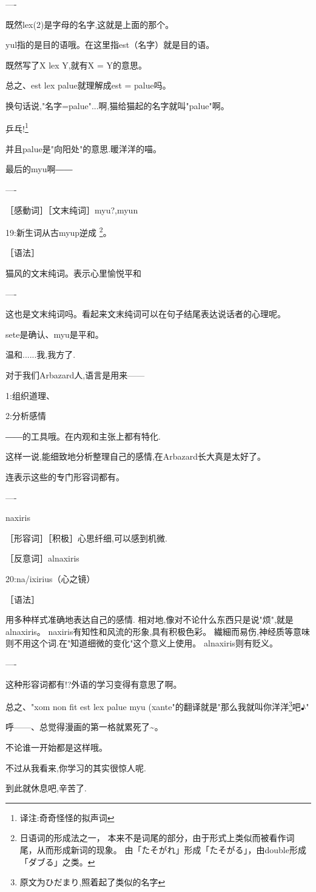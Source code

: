 ----


既然lex(2)是字母的名字,这就是上面的那个。

yul指的是目的语哦。在这里指est（名字）就是目的语。

既然写了X lex Y,就有X = Y的意思。


总之、est lex palue就理解成est = palue吗。

换句话说,"名字=palue"...啊,猫给猫起的名字就叫"palue"啊。



乒乓!\footnote{译注:奇奇怪怪的拟声词}

并且palue是"向阳处"的意思.暖洋洋的喵。

最后的myu啊――

----

［感動词］［文末纯词］myu?,myun

19:新生词从古myup逆成
\footnote{日语词的形成法之一，
本来不是词尾的部分，由于形式上类似而被看作词尾，从而形成新词的现象。
由「たそがれ」形成「たそがる」，由double形成「ダブる」之类。}。

［语法］

猫风的文末纯词。表示心里愉悦平和


----


这也是文末纯词吗。看起来文末纯词可以在句子结尾表达说话者的心理呢。

sete是确认、myu是平和。

温和......我,我方了.



对于我们Arbazard人,语言是用来------

1:组织道理、

2:分析感情

――的工具哦。在内观和主张上都有特化.



这样一说,能细致地分析整理自己的感情,在Arbazard长大真是太好了。

连表示这些的专门形容词都有。

----

naxiris

［形容词］［积极］心思纤细,可以感到机微.

［反意词］alnaxiris

20:na/ixirius（心之镜）

［语法］

用多种样式准确地表达自己的感情.
相对地,像对不论什么东西只是说"烦",就是alnaxiris。
naxiris有知性和风流的形象,具有积极色彩。
繊細而易伤,神经质等意味则不用这个词.在"知道细微的变化"这个意义上使用。
alnaxiris则有贬义。


----

这种形容词都有!?外语的学习变得有意思了啊。

总之、"xom non fit est lex palue myu (xante"的翻译就是"那么我就叫你洋洋\footnote{原文为ひだまり,照着起了类似的名字}吧♪"

呼------、总觉得漫画的第一格就累死了\~{}。


不论谁一开始都是这样哦。

不过从我看来,你学习的其实很惊人呢.

到此就休息吧,辛苦了.











